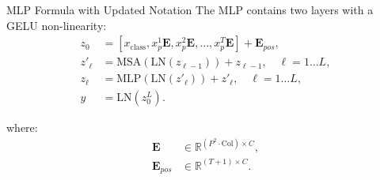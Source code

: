 \documentclass{beamer}
\begin{document}
\begin{frame}{MLP Formula with Updated Notation}
    The MLP contains two layers with a GELU non-linearity:
    \begin{align*}
        z_0 &= \left[ x_{\text{class}}, x_p^1 \mathbf{E}, x_p^2 \mathbf{E}, \dots, x_p^T \mathbf{E} \right] + \mathbf{E}_{pos}, \\
        z'_{\ell} &= \text{MSA}(\text{LN}(z_{\ell-1})) + z_{\ell-1}, \quad \ell = 1 \dots L, \\
        z_{\ell} &= \text{MLP}(\text{LN}(z'_{\ell})) + z'_{\ell}, \quad \ell = 1 \dots L, \\
        y &= \text{LN}(z_0^L).
    \end{align*}

    where:
    \begin{align*}
        \mathbf{E} &\in \mathbb{R}^{(P^2 \cdot \text{Col}) \times C}, \\
        \mathbf{E}_{pos} &\in \mathbb{R}^{(T+1) \times C}.
    \end{align*}
\end{frame}
\end{document}
